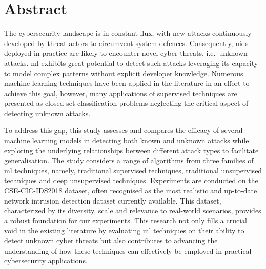 \chapter*{Abstract}

The cybersecurity landscape is in constant flux, with new attacks continuously
developed by threat actors to circumvent system defences. Consequently,
\gls{nids} deployed in practice are likely to encounter novel cyber threats,
i.e.\ unknown attacks. \gls{ml} exhibits great potential to detect such attacks
leveraging its capacity to model complex patterns without explicit developer
knowledge. Numerous machine learning techniques have been applied in the
literature in an effort to achieve this goal, however, many applications of
supervised techniques are presented as closed set classification problems
neglecting the critical aspect of detecting unknown attacks.

To address this gap, this study assesses and compares the efficacy of several
machine learning models in detecting both known and unknown attacks while
exploring the underlying relationships between different attack types to
facilitate generalisation. The study considers a range of algorithms from three
families of \gls{ml} techniques, namely, traditional supervised techniques,
traditional unsupervised techniques and deep unsupervised techniques.
Experiments are conducted on the CSE-CIC-IDS2018 dataset, often recognised as
the most realistic and up-to-date network intrusion detection dataset currently
available. This dataset, characterized by its diversity, scale and relevance to
real-world scenarios, provides a robust foundation for our experiments. This
research not only fills a crucial void in the existing literature by evaluating
\gls{ml} techniques on their ability to detect unknown cyber threats but also
contributes to advancing the understanding of how these techniques can
effectively be employed in practical cybersecurity applications.
